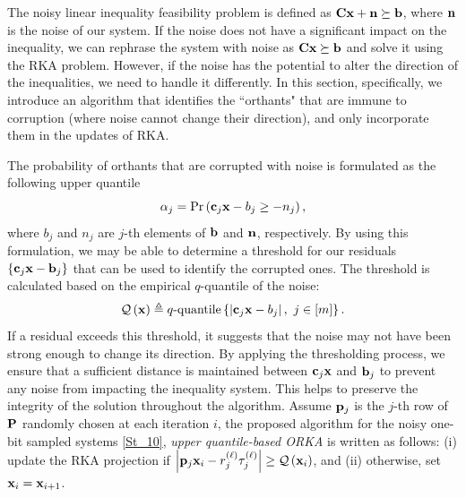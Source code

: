 \documentclass[12pt,draftcls,onecolumn]{IEEEtran}
\newcommand{\Fr}[1]{\textcolor{blue}{#1}}
\begin{document}
The noisy linear inequality feasibility problem is defined as
$\mathbf{C}\mathbf{x}+\mathbf{n}\succeq \mathbf{b}$,
where $\mathbf{n}$ is the noise of our system.
If the noise does not have a significant impact on the inequality, we can rephrase the system with noise as $\mathbf{C}\mathbf{x}\succeq \mathbf{b}$ and solve it using the RKA problem. However, if the noise has the potential to alter the direction of the inequalities, we need to handle it differently. In this section, 
specifically, we introduce an algorithm that identifies the ``orthants" that are immune to corruption
(where noise cannot change their direction), and only incorporate them in the updates of RKA. 

The probability of orthants that are corrupted with noise is formulated as the following upper quantile
\begin{equation}
\label{Stef2}
\alpha_j = \operatorname{Pr}\left(\mbc_j\mbx-b_j\geq -n_j\right),
\end{equation}
where
$b_j$ and $n_j$ are $j$-th
elements of $\mathbf{b}$ and $\mathbf{n}$, respectively. By using this formulation, we may be able to determine a threshold for our residuals $\left\{\mathbf{c}_j\mathbf{x}-\mathbf{b}_j\right\}$ that can be used to identify the corrupted ones. The threshold is calculated based on the empirical $q$-quantile of the noise:
\begin{equation}
\label{Stef3}
\mathcal{Q}\left(\mbx\right) \triangleq q\text{-quantile}\left\{\left|\mbc_j\mbx-b_j\right|,~j\in [m]\right\}.
\end{equation}
If a residual exceeds this threshold, it suggests that the noise may not have been strong enough to change its direction. By applying the thresholding process, we ensure that a sufficient distance is maintained between $\mathbf{c}_j\mathbf{x}$ and $\mathbf{b}_j$ to prevent any noise from impacting the inequality system. This helps to preserve the integrity of the solution throughout the algorithm. Assume $\mathbf{p}_j$ is the $j$-th row of $\mathbf{P}$ randomly chosen at each iteration $i$, the proposed algorithm for the noisy one-bit sampled systems \eqref{St_10}, \emph{upper quantile-based ORKA} is written as follows: (i) update the RKA projection if $\left|\mathbf{p}_j\mathbf{x}_i-r^{(\ell)}_j\tau^{(\ell)}_j\right|\geq \mathcal{Q}\left(\mathbf{x}_i\right)$, and (ii) otherwise, set $\mathbf{x}_i=\mathbf{x}_{i+1}$.
\end{document}
